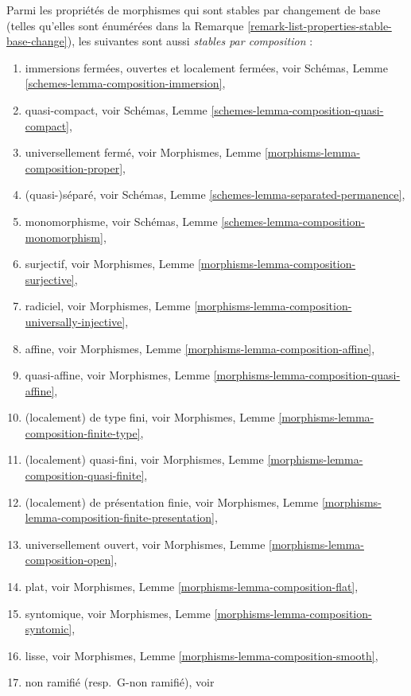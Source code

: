 \begin{remark}
\label{remark-list-properties-stable-composition}
Parmi les propriétés de morphismes qui sont stables par changement de base
(telles qu'elles sont énumérées dans la
Remarque \ref{remark-list-properties-stable-base-change}),
les suivantes sont aussi {\it stables par composition} :
\begin{enumerate}
\item immersions fermées, ouvertes et localement fermées, voir
Schémas, Lemme \ref{schemes-lemma-composition-immersion},
\item quasi-compact, voir
Schémas, Lemme \ref{schemes-lemma-composition-quasi-compact},
\item universellement fermé, voir
Morphismes, Lemme \ref{morphisms-lemma-composition-proper},
\item (quasi-)séparé, voir
Schémas, Lemme \ref{schemes-lemma-separated-permanence},
\item monomorphisme, voir
Schémas, Lemme \ref{schemes-lemma-composition-monomorphism},
\item surjectif, voir
Morphismes, Lemme \ref{morphisms-lemma-composition-surjective},
\item radiciel, voir
Morphismes, Lemme \ref{morphisms-lemma-composition-universally-injective},
\item affine, voir
Morphismes, Lemme \ref{morphisms-lemma-composition-affine},
\item quasi-affine, voir
Morphismes, Lemme \ref{morphisms-lemma-composition-quasi-affine},
\item (localement) de type fini, voir
Morphismes, Lemme \ref{morphisms-lemma-composition-finite-type},
\item (localement) quasi-fini, voir
Morphismes, Lemme \ref{morphisms-lemma-composition-quasi-finite},
\item (localement) de présentation finie, voir
Morphismes, Lemme \ref{morphisms-lemma-composition-finite-presentation},
\item universellement ouvert, voir
Morphismes, Lemme \ref{morphisms-lemma-composition-open},
\item plat, voir
Morphismes, Lemme \ref{morphisms-lemma-composition-flat},
\item syntomique, voir
Morphismes, Lemme \ref{morphisms-lemma-composition-syntomic},
\item lisse, voir
Morphismes, Lemme \ref{morphisms-lemma-composition-smooth},
\item non ramifié (resp.\ G-non ramifié), voir

\end{enumerate}
\end{remark}

